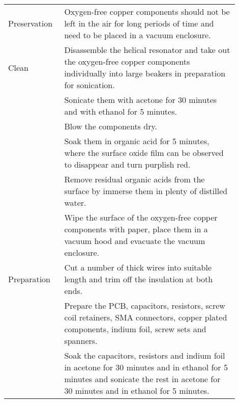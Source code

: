 \begin{table}
\begin{tabular}{p{0.2\linewidth}p{0.7\linewidth}}
        \midrule
        Preservation & Oxygen-free copper components should not be left in the air for long periods of time and need to be placed in a vacuum enclosure.                                                                                          \\
        Clean        & Disassemble the helical resonator and take out the oxygen-free copper components individually into large beakers in preparation for sonication.                                                                            \\
                     & Sonicate them with acetone for 30 minutes and with ethanol for 5 minutes.                                                                                                                                                  \\
                     & Blow the components dry.                                                                                                                                                                                                   \\
                     & Soak them in organic acid for 5 minutes, where the surface oxide film can be observed to disappear and turn purplish red.                                                                                                  \\
                     & Remove residual organic acids from the surface by immerse them in plenty of distilled water.                                                                                                                               \\
                     & Wipe the surface of the oxygen-free copper components with paper, place them in a vacuum hood and evacuate the vacuum enclosure.                                                                                           \\
        Preparation  & Cut a number of thick wires into suitable length and trim off the insulation at both ends.                                                                                                                                 \\
                     & Prepare the PCB, capacitors, resistors, screw coil retainers, SMA connectors, copper plated components, indium foil, screw sets and spanners.                                                                              \\
                     & Soak the capacitors, resistors and indium foil in acetone for 30 minutes and in ethanol for 5 minutes and sonicate the rest in acetone for 30 minutes and in ethanol for 5 minutes.                                        \\

\end{tabular}
\end{table}

